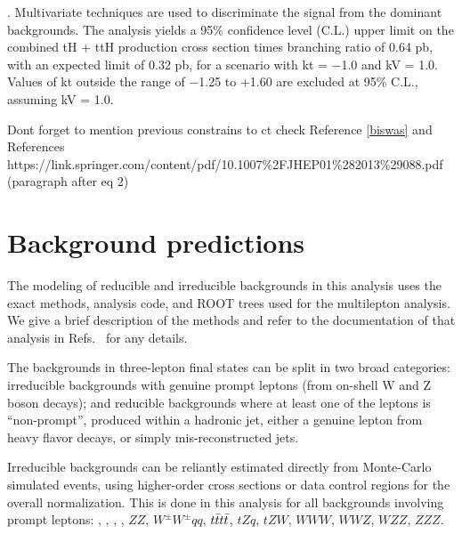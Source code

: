 . Multivariate techniques are used to discriminate the signal from the dominant backgrounds. The analysis yields a 95\% confidence level (C.L.) upper limit on the combined tH + ttH production cross section times branching ratio of 0.64 pb, with an expected limit of 0.32 pb, for a scenario with kt = −1.0 and kV = 1.0. Values of kt outside the range of −1.25 to +1.60 are excluded at 95\% C.L., assuming kV = 1.0.

Dont forget to mention previous constrains to ct check Reference \ref{biswas} and References https://link.springer.com/content/pdf/10.1007\%2FJHEP01\%282013\%29088.pdf (paragraph after eq 2)




























\section{Background predictions}
\label{secc:bg}

The modeling of reducible and irreducible backgrounds in this analysis uses the exact methods, analysis code, and ROOT trees used for the \ttH multilepton analysis. We give a brief description of the methods and refer to the documentation of that analysis in Refs.~\cite{CMS_AN_2016-211,CMS_AN_2017-029} for any details.

The backgrounds in three-lepton final states can be split in two broad categories: irreducible backgrounds with genuine prompt leptons (\ie from on-shell W and Z boson decays); and reducible backgrounds where at least one of the leptons is ``non-prompt'', \ie produced within a hadronic jet, either a genuine lepton from heavy flavor decays, or simply mis-reconstructed jets. %

Irreducible backgrounds can be reliantly estimated directly from Monte-Carlo simulated events, using higher-order cross sections or data control regions for the overall normalization. This is done in this analysis for all backgrounds involving prompt leptons: \ttW, \ttZ, \ttH, \WZ, $ZZ$, $W^\pm W^\pm qq$, $t\bar{t}t\bar{t}$, $tZq$, $tZW$, $WWW$, $WWZ$, $WZZ$, $ZZZ$.

